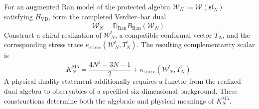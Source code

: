 \begin{problem}
\label{prop:phantom-m5-koszul-dual}
For an augmented Ran model of the protected algebra
$\mathcal W_N:=\mathcal W(\mathfrak{sl}_N)$ satisfying
$H_{\mathrm{VD}}$, form the completed
Verdier--bar dual
\[
 \mathcal W_N^!
 =\mathbb D_{\operatorname{Ran}}B_{\operatorname{Ran}}(\mathcal W_N).
\]
Construct a chiral realization of $\mathcal W_N^!$, a compatible
conformal vector $T_N^!$, and the corresponding stress trace
$\kappa_{\mathrm{stress}}(\mathcal W_N^!,T_N^!)$.  The resulting
complementarity scalar is
\begin{equation}\label{eq:m5-complementarity-polynomial}
 K_N^{\mathrm{M5}}
 =\frac{4N^3-3N-1}{2}
 +\kappa_{\mathrm{stress}}(\mathcal W_N^!,T_N^!).
\end{equation}
A physical duality statement additionally requires a functor from the
realized dual algebra to observables of a specified six-dimensional
background.  These constructions determine both the algebraic and
physical meanings of $K_N^{\mathrm{M5}}$.
\end{problem}


